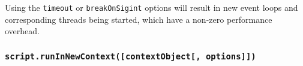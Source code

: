 \begin{Shaded}
\begin{Highlighting}[]
\OperatorTok{=} \NormalTok{(}\NormalTok{)}\OperatorTok{;}

\OperatorTok{=}\NormalTok{ \{}
  \OperatorTok{:} \OperatorTok{,}
  \OperatorTok{:} \OperatorTok{,}
\NormalTok{\}}\OperatorTok{;}

\OperatorTok{=} \NormalTok{(}\NormalTok{)}\OperatorTok{;}

\OperatorTok{;}
\NormalTok{ (}\OperatorTok{=} \OperatorTok{;}\OperatorTok{\textless{}} \OperatorTok{;} \OperatorTok{++}
\OperatorTok{;}
\NormalTok{\}}

\OperatorTok{;}
\end{Highlighting}
\end{Shaded}

Using the \texttt{timeout} or \texttt{breakOnSigint} options will result
in new event loops and corresponding threads being started, which have a
non-zero performance overhead.

\subsubsection{\texorpdfstring{\texttt{script.runInNewContext({[}contextObject{[},\ options{]}{]})}}{script.runInNewContext({[}contextObject{[}, options{]}{]})}}\label{script.runinnewcontextcontextobject-options}

